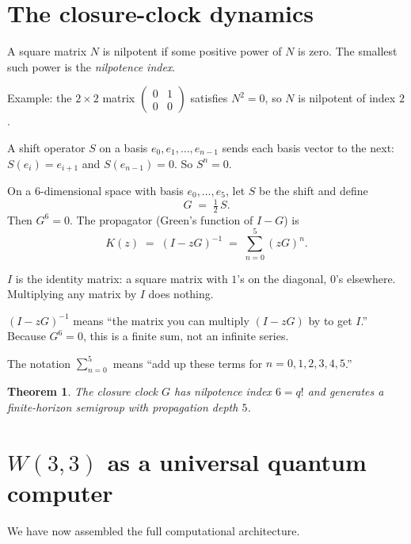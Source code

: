 \documentclass[11pt]{article}
\def\textbf#1{#1}%
\newtheorem*{theorem}{Theorem}
\begin{document}
\section{The closure-clock dynamics}

\begin{mathnote}
A square matrix $N$ is \textbf{nilpotent} if some positive power of $N$ is zero. The smallest such power is the \emph{nilpotence index}.

Example: the $2 \times 2$ matrix $\begin{pmatrix} 0 & 1 \\ 0 & 0 \end{pmatrix}$ satisfies $N^2 = 0$, so $N$ is nilpotent of index $2$.

A \textbf{shift operator} $S$ on a basis $e_0, e_1, \ldots, e_{n-1}$ sends each basis vector to the next: $S(e_i) = e_{i+1}$ and $S(e_{n-1}) = 0$. So $S^n = 0$.
\end{mathnote}

On a $6$-dimensional space with basis $e_0, \ldots, e_5$, let $S$ be the shift and define
\[
G \;=\; \tfrac{1}{2}\,S.
\]
Then $G^6 = 0$. The propagator (Green's function of $I - G$) is
\[
K(z) \;=\; (I - zG)^{-1} \;=\; \sum_{n=0}^{5} (zG)^n.
\]

\begin{mathnote}
$I$ is the \textbf{identity matrix}: a square matrix with $1$'s on the diagonal, $0$'s elsewhere. Multiplying any matrix by $I$ does nothing.

$(I - zG)^{-1}$ means ``the matrix you can multiply $(I - zG)$ by to get $I$.'' Because $G^6 = 0$, this is a finite sum, not an infinite series.

The notation $\sum_{n=0}^{5}$ means ``add up these terms for $n = 0, 1, 2, 3, 4, 5$.''
\end{mathnote}

\begin{theorem}
The closure clock $G$ has nilpotence index $6 = q!$ and generates a finite-horizon semigroup with propagation depth $5$.
\end{theorem}

\section{\texorpdfstring{$W(3,3)$ as a universal quantum computer}{W(3,3) as a universal quantum computer}}

We have now assembled the full computational architecture.
\end{document}
